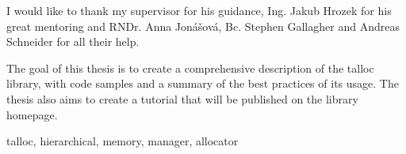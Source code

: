 \setcounter{page}{1}

\begin{ThesisDeclaration}
  \DeclarationText
  \AdvisorName
\end{ThesisDeclaration}

\begin{ThesisThanks}
I would like to thank my supervisor for his guidance, Ing. Jakub Hrozek for
his great mentoring and RNDr. Anna Jonášová, Bc. Stephen Gallagher and Andreas
Schneider for all their help.
\end{ThesisThanks}

\begin{ThesisAbstract}
The goal of this thesis is to create a comprehensive description of the talloc
library, with code samples and a summary of the best practices of its usage. The
thesis also aims to create a tutorial that will be published on the library
homepage.
\end{ThesisAbstract}

\begin{ThesisKeyWords}
  talloc, hierarchical, memory, manager, allocator
\end{ThesisKeyWords}